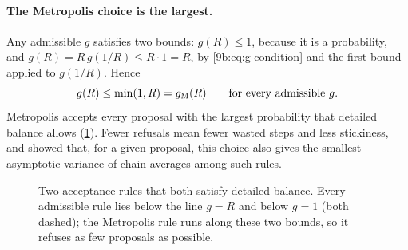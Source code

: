 \paragraph{The Metropolis choice is the largest.}
Any admissible $g$ satisfies two bounds: $g(R)\le1$, because it is a probability, and
$g(R)=R\,g(1/R)\le R\cdot1=R$, by \eqref{9b:eq:g-condition} and the first bound applied to
$g(1/R)$. Hence
\begin{equation}
  g(R)\le\min(1,R)=g_{\rm M}(R)\qquad\text{for every admissible }g .
  \label{9b:eq:peskun}
\end{equation}
Metropolis accepts every proposal with the largest probability that detailed balance allows
(\cref{9b:fig:g-family}). Fewer refusals mean fewer wasted steps and less stickiness, and
\textcite{Peskun1973} showed that, for a given proposal, this choice also gives the smallest
asymptotic variance of chain averages among such rules.

\begin{figure}[htbp]
\centering
{}
\caption{Two acceptance rules that both satisfy detailed balance. Every admissible rule lies
below the line $g=R$ and below $g=1$ (both dashed); the Metropolis rule runs along these two
bounds, so it refuses as few proposals as possible.}
\label{9b:fig:g-family}
\end{figure}

